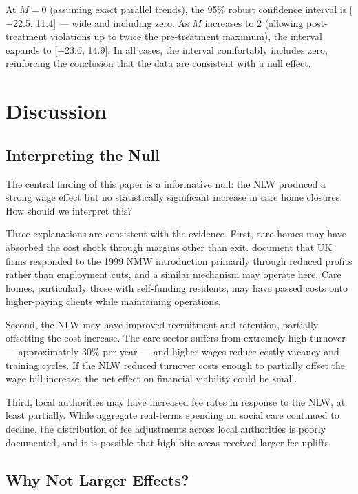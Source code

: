 \documentclass[12pt]{article}
\begin{document}
At $M = 0$ (assuming exact parallel trends), the 95\% robust confidence interval is [$-$22.5, 11.4] --- wide and including zero. As $M$ increases to 2 (allowing post-treatment violations up to twice the pre-treatment maximum), the interval expands to [$-$23.6, 14.9]. In all cases, the interval comfortably includes zero, reinforcing the conclusion that the data are consistent with a null effect.


\section{Discussion}
\label{sec:discussion}

\subsection{Interpreting the Null}

The central finding of this paper is a informative null: the NLW produced a strong wage effect but no statistically significant increase in care home closures. How should we interpret this?

Three explanations are consistent with the evidence. First, care homes may have absorbed the cost shock through margins other than exit. \citet{draca2011minimum} document that UK firms responded to the 1999 NMW introduction primarily through reduced profits rather than employment cuts, and a similar mechanism may operate here. Care homes, particularly those with self-funding residents, may have passed costs onto higher-paying clients while maintaining operations.

Second, the NLW may have improved recruitment and retention, partially offsetting the cost increase. The care sector suffers from extremely high turnover --- approximately 30\% per year \citep{skills2019state} --- and higher wages reduce costly vacancy and training cycles. If the NLW reduced turnover costs enough to partially offset the wage bill increase, the net effect on financial viability could be small.

Third, local authorities may have increased fee rates in response to the NLW, at least partially. While aggregate real-terms spending on social care continued to decline, the distribution of fee adjustments across local authorities is poorly documented, and it is possible that high-bite areas received larger fee uplifts.

\subsection{Why Not Larger Effects?}
\end{document}
